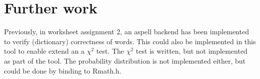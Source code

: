 \documentclass[10pt,a4paper]{article}
\def\File#1{\textsf{#1}}
\begin{document}
\section*{Further work}
Previously, in worksheet assignment 2, an aspell backend has been implemented to verify (dictionary) correctness of words. This could also be implemented in this tool to enable extend an a $\chi^2$ test.
The $\chi^2$ test is written, but not implemented as part of the tool. The probability distribution is not implemented either, but could be done by binding to \File{Rmath.h}.
\end{document}

